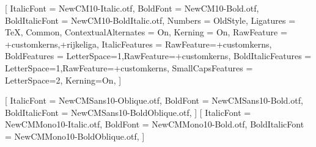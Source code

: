 \setmainfont{NewCM10-Regular.otf}[
  ItalicFont = NewCM10-Italic.otf,
  BoldFont = NewCM10-Bold.otf,
  BoldItalicFont = NewCM10-BoldItalic.otf,
  Numbers = OldStyle,
  Ligatures = {TeX, Common},
  ContextualAlternates = On,
  Kerning = On,
  RawFeature = {+customkerns,+rijkeliga},
  ItalicFeatures = {RawFeature={+customkerns}},
  BoldFeatures = {LetterSpace=1,RawFeature={+customkerns}},
  BoldItalicFeatures = {LetterSpace=1,RawFeature={+customkerns}},
  SmallCapsFeatures = {LetterSpace=2, Kerning=On},
]

\setsansfont{NewCMSans10-Regular.otf}[
  ItalicFont = NewCMSans10-Oblique.otf,
  BoldFont = NewCMSans10-Bold.otf,
  BoldItalicFont = NewCMSans10-BoldOblique.otf,
]
\setmonofont{NewCMMono10-Regular.otf}[
  ItalicFont = NewCMMono10-Italic.otf,
  BoldFont = NewCMMono10-Bold.otf,
  BoldItalicFont = NewCMMono10-BoldOblique.otf,
]
\linespread{1.08}

\newcommand{\VersionFontName}{New Computer Modern}






